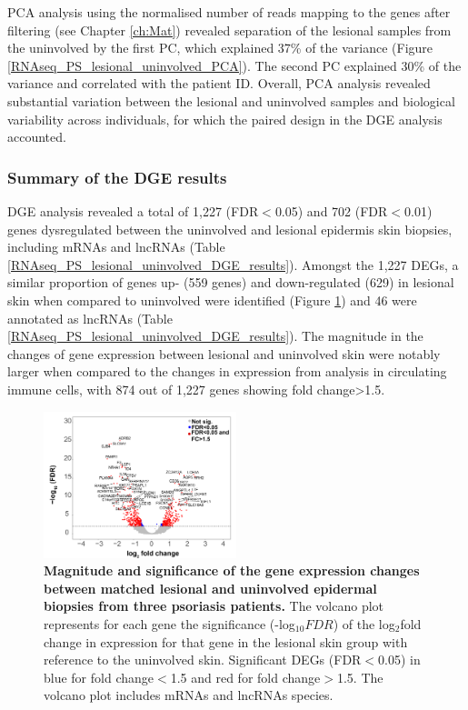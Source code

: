 PCA analysis using the normalised number of reads mapping to the genes after filtering (see Chapter \ref{ch:Mat}) revealed separation of the lesional samples from the uninvolved by the first PC, which explained 37\% of the variance (Figure \ref{RNAseq_PS_lesional_uninvolved_PCA}). The second PC explained 30\% of the variance and correlated with the patient ID. Overall, PCA analysis revealed substantial variation between the lesional and uninvolved samples and biological variability across individuals, for which the paired design in the DGE analysis accounted.  


\subsubsection{Summary of the DGE results}

DGE analysis revealed a total of 1,227 (FDR$<$0.05) and 702 (FDR$<$0.01) genes dysregulated between the uninvolved and lesional epidermis skin biopsies, including mRNAs and lncRNAs (Table \ref{RNAseq_PS_lesional_uninvolved_DGE_results}). Amongst the 1,227 DEGs, a similar proportion of genes up- (559 genes) and down-regulated (629) in lesional skin when compared to uninvolved were identified (Figure \ref{figure:Skin_DGE_volcano_plot}) and 46 were annotated as lncRNAs (Table \ref{RNAseq_PS_lesional_uninvolved_DGE_results}). The magnitude in the changes of gene expression between lesional and uninvolved skin were notably larger when compared to the changes in expression from analysis in circulating immune cells, with 874 out of 1,227 genes showing fold change>1.5.  



\begin{figure}[htbp]
\centering
\includegraphics[width=0.5\textwidth]{./Results2/pdfs/RNA_PS_lesional_uninvolved_volcano_plot}
\caption[Magnitude and significance of the gene expression changes between matched lesional and uninvolved epidermal biopsies from three psoriasis patients.]{\textbf{Magnitude and significance of the gene expression changes between matched lesional and uninvolved epidermal biopsies from three psoriasis patients.} The volcano plot represents for each gene the significance (-log$_{10}FDR$) of the log$_2$fold change in expression for that gene in the lesional skin group with reference to the uninvolved skin. Significant DEGs (FDR$<$0.05) in blue for fold change$<$1.5 and red for fold change$>$1.5. The volcano plot includes mRNAs and lncRNAs species.}
\label{figure:Skin_DGE_volcano_plot}
\end{figure}

